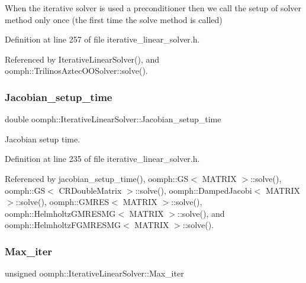 When the iterative solver is used a preconditioner then we call the setup of solver method only once (the first time the solve method is called) 

Definition at line 257 of file iterative\+\_\+linear\+\_\+solver.\+h.



Referenced by Iterative\+Linear\+Solver(), and oomph\+::\+Trilinos\+Aztec\+O\+O\+Solver\+::solve().

\mbox{\label{classoomph_1_1IterativeLinearSolver_a82a12e45c78e910b46e9d0935beb8f0d}} 
\subsubsection{\texorpdfstring{Jacobian\+\_\+setup\+\_\+time}{Jacobian\_setup\_time}}
{\footnotesize\ttfamily double oomph\+::\+Iterative\+Linear\+Solver\+::\+Jacobian\+\_\+setup\+\_\+time\hspace{0.3cm}{\ttfamily [protected]}}



Jacobian setup time. 



Definition at line 235 of file iterative\+\_\+linear\+\_\+solver.\+h.



Referenced by jacobian\+\_\+setup\+\_\+time(), oomph\+::\+G\+S$<$ M\+A\+T\+R\+I\+X $>$\+::solve(), oomph\+::\+G\+S$<$ C\+R\+Double\+Matrix $>$\+::solve(), oomph\+::\+Damped\+Jacobi$<$ M\+A\+T\+R\+I\+X $>$\+::solve(), oomph\+::\+G\+M\+R\+E\+S$<$ M\+A\+T\+R\+I\+X $>$\+::solve(), oomph\+::\+Helmholtz\+G\+M\+R\+E\+S\+M\+G$<$ M\+A\+T\+R\+I\+X $>$\+::solve(), and oomph\+::\+Helmholtz\+F\+G\+M\+R\+E\+S\+M\+G$<$ M\+A\+T\+R\+I\+X $>$\+::solve().

\mbox{\label{classoomph_1_1IterativeLinearSolver_a9bdc42768d009b093fd7bc23647dc989}} 
\subsubsection{\texorpdfstring{Max\+\_\+iter}{Max\_iter}}
{\footnotesize\ttfamily unsigned oomph\+::\+Iterative\+Linear\+Solver\+::\+Max\+\_\+iter\hspace{0.3cm}{\ttfamily [protected]}}



